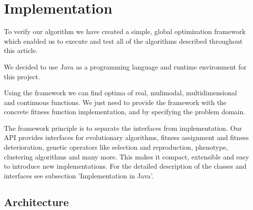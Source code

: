 

\chapter{Implementation}
\label{ch:Implementation}
To verify our algorithm we have created a simple, global optimization framework
which enabled us to execute and test all of the algorithms described throughout
this article.

We decided to use Java as a programming language and runtime
environment for this project. 

Using the framework we can find optima of real, mulimodal, multidimensional and
continuous functions. We just need to provide the framework with the concrete
fitness function implementation, and by specifying the problem domain.

The framework principle is to separate the interfaces from implementation.
Our API provides interfaces for evolutionary algorithms, fitness assignment
and fitness deterioration, genetic operators like selection and reproduction,
phenotype, clustering algorithms and many more. This makes it compact,
extensible and easy to introduce new implementations.
For the detailed description of the classes and interfaces see subsection
'Implementation in Java'.  

\section{Architecture}
\label{sec:architecture}

